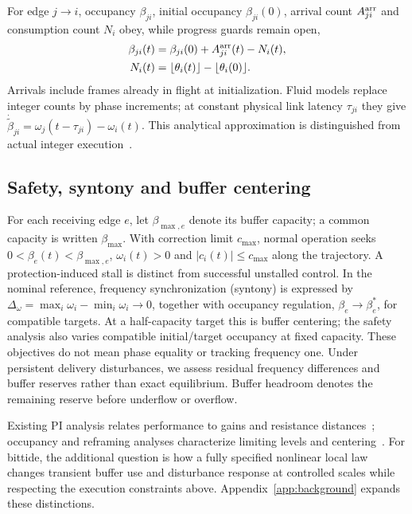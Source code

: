 For edge $j\to i$, occupancy $\beta_{ji}$, initial occupancy
$\beta_{ji}(0)$, arrival count $A_{ji}^{\rm arr}$ and consumption
count $N_i$ obey, while progress guards remain open,
\begin{align}
 \beta_{ji}(t)&=\beta_{ji}(0)+A_{ji}^{\rm arr}(t)-N_i(t),\nonumber\\
 N_i(t)&=\lfloor\theta_i(t)\rfloor-\lfloor\theta_i(0)\rfloor.
 \label{eq:bg_count_balance}
\end{align}
Arrivals include frames already in flight at initialization. Fluid
models replace integer counts by phase increments; at constant physical
link latency $\tau_{ji}$ they give
$\dot{\widetilde\beta}_{ji}=\omega_j(t-\tau_{ji})-\omega_i(t)$.
This analytical approximation is distinguished from actual integer
execution~\cite{lall2022resistance,lall2024bufferOccupancy}.

\subsection{Safety, syntony and buffer centering}
For each receiving edge $e$, let $\beta_{\max,e}$ denote its buffer
capacity; a common capacity is written $\beta_{\max}$. With correction
limit $c_{\max}$, normal operation
seeks $0<\beta_e(t)<\beta_{\max,e}$, $\omega_i(t)>0$ and
$|c_i(t)|\le c_{\max}$ along the trajectory. A protection-induced
stall is distinct from successful unstalled control. In the nominal
reference, frequency synchronization (syntony) is expressed by
$\Delta_\omega=\max_i\omega_i-\min_i\omega_i\to0$, together with
occupancy regulation, $\beta_e\to\beta_e^*$, for compatible targets.
At a half-capacity target this is buffer centering; the safety analysis
also varies compatible initial/target occupancy at fixed capacity. These objectives
do not mean phase equality or tracking frequency one. Under persistent
delivery disturbances, we assess residual frequency differences and buffer reserves
rather than exact equilibrium. Buffer headroom denotes the remaining
reserve before underflow or overflow.

Existing PI analysis relates performance to gains and resistance
distances~\cite{lall2022resistance}; occupancy and reframing analyses
characterize limiting levels and centering~\cite{lall2024bufferOccupancy,lall2023bufferCentering}.
For bittide, the additional question is how a fully specified nonlinear
local law changes transient buffer use and disturbance response at
controlled scales while respecting the execution constraints above. Appendix~\ref{app:background} expands these distinctions.
